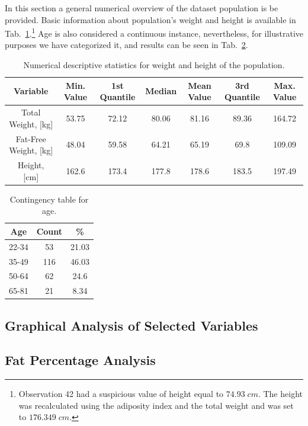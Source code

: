 \documentclass[11pt,american,american]{article}
\begin{document}
In this section a general numerical overview of the dataset population is be provided. Basic information about population's weight and height is available in Tab.~\ref{tab:desc1}.\footnote{Observation 42 had a suspicious value of height equal to $74.93\;cm$. The height was recalculated using the adiposity index and the total weight and was set to $176.349\;cm$.} Age is also considered a continuous instance, nevertheless, for illustrative purposes we have categorized it, and results can be seen in Tab.~\ref{tab:desc2}. 

\medskip

\begin{table}[ht!]
	\centering
	\begin{tabular}{|c||c|c|c|c|c|c|}
		\hline 
		Variable &  Min. Value &  1st Quantile &  Median &  Mean Value &  3rd Quantile & Max. Value   \\ 
		\hline \hline 
		Total Weight, [kg] & 53.75 & 72.12 & 80.06 & 81.16 & 89.36 & 164.72   \\ 
		\hline 
		Fat-Free Weight, [kg] & 48.04 & 59.58 & 64.21 & 65.19 & 69.8 & 109.09   \\ 
		\hline 
		Height, [cm] & 162.6 & 173.4 & 177.8 & 178.6 & 183.5 & 197.49   \\ 
		\hline 
	\end{tabular} 
	\caption{Numerical descriptive statistics for weight and height of the population.}	
	\label{tab:desc1}
\end{table}

\begin{table}[ht!]
	\centering
	\begin{tabular}{|c||c|c|}
		\hline 
		Age & Count &  \%   \\ 
		\hline \hline 
		22-34 & 53 & 21.03   \\
		\hline
		35-49 & 116 & 46.03  \\
		\hline  
		50-64 & 62 &  24.6  \\
		\hline 
		65-81 & 21 &  8.34  \\
		\hline 
	
	\end{tabular} 
	\caption{Contingency table for age.}
	\label{tab:desc2}	
\end{table}
 
\subsection{Graphical Analysis of Selected Variables}

\subsection{Fat Percentage Analysis}
\end{document}

